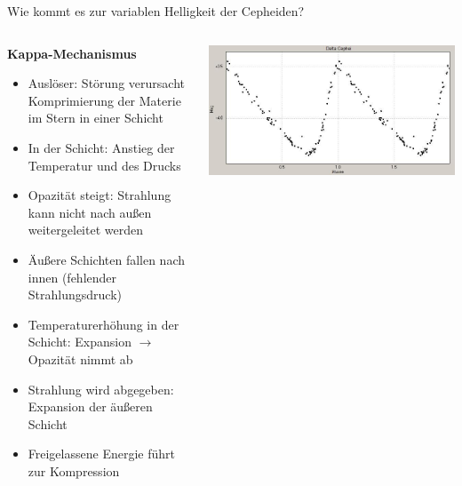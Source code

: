 \begin{frame}{Wie kommt es zur variablen Helligkeit der Cepheiden?}
  \begin{columns}
    \begin{column}{0.5\textwidth}
      \textbf{Kappa-Mechanismus}
\begin{itemize}
  \item Auslöser: Störung verursacht Komprimierung der Materie im Stern in einer Schicht
  \item In der Schicht: Anstieg der Temperatur und des Drucks
  \item Opazität steigt: Strahlung kann nicht nach außen weitergeleitet werden
  \item Äußere Schichten fallen nach innen (fehlender Strahlungsdruck)
  \item Temperaturerhöhung in der Schicht: Expansion $\rightarrow$ Opazität nimmt ab
  \item Strahlung wird abgegeben: Expansion der äußeren Schicht
  \item Freigelassene Energie führt zur Kompression
\end{itemize}
    \end{column}
    \begin{column}{0.5\textwidth}
        \includegraphics[width=\textwidth]{images/Delta_Cephei.jpg}
      \end{column}
  \end{columns}
\end{frame}
